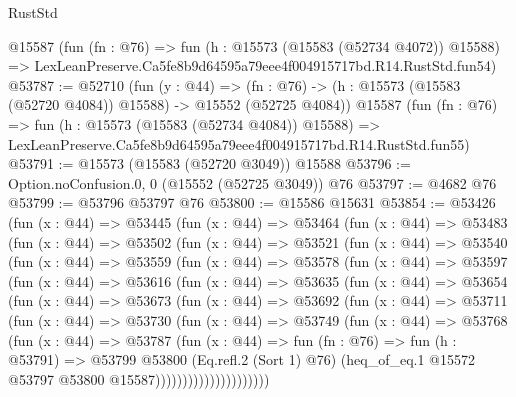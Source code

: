 \begin{lexlean}{RustStd}
\begin{coremodule}
    @15587
    (fun (fn : @76) =>
    fun (h : @15573 (@15583 (@52734 @4072)) @15588) =>
    LexLeanPreserve.Ca5fe8b9d64595a79eee4f004915717bd.R14.RustStd.fun54)
@53787 := @52710
    (fun (y : @44) =>
    (fn : @76) -> (h : @15573 (@15583 (@52720 @4084)) @15588) -> @15552 (@52725 @4084))
    @15587
    (fun (fn : @76) =>
    fun (h : @15573 (@15583 (@52734 @4084)) @15588) =>
    LexLeanPreserve.Ca5fe8b9d64595a79eee4f004915717bd.R14.RustStd.fun55)
@53791 := @15573 (@15583 (@52720 @3049)) @15588
@53796 := Option.noConfusion.{0, 0} (@15552 (@52725 @3049)) @76
@53797 := @4682 @76
@53799 := @53796 @53797 @76
@53800 := @15586 @15631
@53854 := @53426
    (fun (x : @44) =>
    @53445
      (fun (x : @44) =>
      @53464
        (fun (x : @44) =>
        @53483
          (fun (x : @44) =>
          @53502
            (fun (x : @44) =>
            @53521
              (fun (x : @44) =>
              @53540
                (fun (x : @44) =>
                @53559
                  (fun (x : @44) =>
                  @53578
                    (fun (x : @44) =>
                    @53597
                      (fun (x : @44) =>
                      @53616
                        (fun (x : @44) =>
                        @53635
                          (fun (x : @44) =>
                          @53654
                            (fun (x : @44) =>
                            @53673
                              (fun (x : @44) =>
                              @53692
                                (fun (x : @44) =>
                                @53711
                                  (fun (x : @44) =>
                                  @53730
                                    (fun (x : @44) =>
                                    @53749
                                      (fun (x : @44) =>
                                      @53768
                                        (fun (x : @44) =>
                                        @53787
                                          (fun (x : @44) =>
                                          fun (fn : @76) =>
                                          fun (h : @53791) =>
                                          @53799
                                            @53800
                                            (Eq.refl.{2} (Sort 1) @76)
                                            (heq_of_eq.{1}
                                              @15572
                                              @53797
                                              @53800
                                              @15587)))))))))))))))))))))

\end{coremodule}
\end{lexlean}
